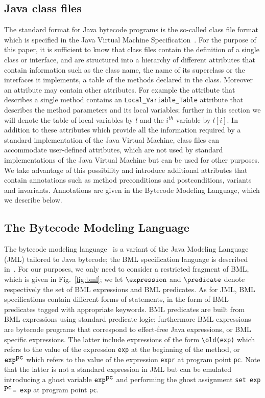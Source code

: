 \subsection{Java class files} \label{classFileFormat}
The standard format for Java bytecode programs is the so-called class
file format which is specified in the Java Virtual Machine
Specification~\cite{JVMspec}. For the purpose of this paper, it is
sufficient to know that class files contain the definition of a single
class or interface, and are structured into a hierarchy of different attributes that
contain information such as the class name, the name of its superclass
or the interfaces it implements, a table of the methods declared in the class. 
Moreover an attribute may contain other attributes. For example the attribute that 
describes a single method contains an \verb!Local_Variable_Table! attribute that describes 
the method parameters and its local variables; further in this section we will denote the 
table of local variables by $l$ and the $i^{th}$ variable by $l[i]$. In addition to these attributes which
provide all the information required by a standard implementation of
the Java Virtual Machine, class files can accommodate user-defined
attributes, which are not used by standard implementations of the Java
Virtual Machine but can be used for other purposes. We take advantage
of this possibility and introduce additional attributes that contain
annotations such as method preconditions and postconditions, variants
and invariants. Annotations are given in the Bytecode Modeling
Language, which we describe below.

\subsection{The  Bytecode Modeling Language}
The bytecode modeling language \annotation\ is a variant of the Java
Modeling Language (JML) \cite{JMLRefMan} tailored to Java bytecode;
the BML specification language is described in~\cite{LM05:acc}. For
our purposes, we only need to consider a restricted fragment of BML,
which is given in Fig.~\ref{fig:bml}; we let $\expression$ and
$\predicate$ denote respectively the set of BML expressions and BML
predicates. As for JML, BML specifications contain different forms of
statements, in the form of BML predicates tagged with appropriate
keywords. BML predicates are built from BML expressions using standard
predicate logic; furthermore BML expressions are bytecode programs
that correspond to effect-free Java expressions, or BML specific
expressions.  The latter include expressions of the form
\verb!\old(exp)! which refers to the value of the expression
\verb!exp! at the beginning of the method, or
$\mbox{\tt exp}^{\mbox{{\tt pc}}}$ which refers to the
value of the expression \verb!expr! at program point
\verb!pc!. Note that the latter is not a standard expression in JML
but can be emulated introducing a ghost variable 
$\mbox{\tt exp}^{\mbox{{\tt pc}}}$ and performing the ghost 
assignment \verb!set exp!$\mbox{}^{\mbox{{\tt pc}}}$\verb!= exp! at
program point \verb!pc!.

